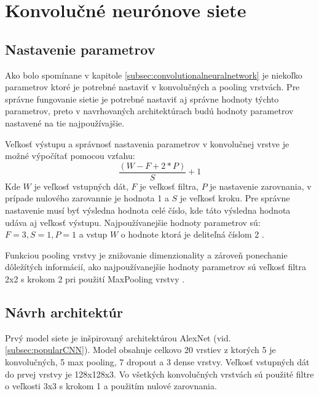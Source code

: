 
\section{Konvolučné neurónove siete}
\label{sec:architekuraCNN}

\subsection{Nastavenie parametrov}
\label{subsec:nastavenieparametrov}
Ako bolo spomínane v kapitole \ref{subsec:convolutionalneuralnetwork} je niekoľko parametrov ktoré je potrebné
    nastaviť v konvolučných a pooling vrstvách.
Pre správne fungovanie sietie je potrebné nastaviť aj správne hodnoty týchto parametrov, preto v navrhovaných architektúrach budú
    hodnoty parametrov nastavené na tie najpoužívajšie.

Veľkosť výstupu a správnosť nastavenia parametrov v konvolučnej vrstve je možné výpočítať pomocou vzťahu:
\begin{equation}
    \frac{(W - F + 2*P)}{S} + 1
\end{equation}
Kde $W$ je veľkosť vstupných dát, $F$ je veľkosť filtra, $P$ je nastavenie zarovnania, v prípade nulového zarovannie je hodnota 1 a $S$ je veľkosť kroku.
Pre správne nastavenie musí byť výsledna hodnota celé číslo, kde táto výsledna hodnota udáva aj veľkosť výstupu.
Najpoužívanejšie hodnoty parametrov sú: $F = 3, S = 1, P = 1$ a vstup $W$ o hodnote ktorá je deliteľná číslom 2 \cite{odkaz:CNNArchitecture}.

Funkciou pooling vrstvy je znižovanie dimenzionality a zároveň ponechanie dôležítých informácií, ako najpoužívanejšie hodnoty parametrov sú
    veľkosť filtra 2x2 s krokom 2 pri použití MaxPooling vrstvy \cite{odkaz:CNNArchitecture}.


\subsection{Návrh architektúr}
\label{subsec:navrharchitektur}
Prvý model siete je inšpirovaný architektúrou AlexNet (vid. \ref{subsec:popularCNN}).
Model obsahuje celkovo 20 vrstiev z ktorých 5 je konvolučných, 5 max pooling, 7 dropout a 3 dense vrstvy.
Veľkosť vstupných dát do prvej vrstvy je 128x128x3.
Vo všetkých konvolučných vrstvách sú použité filtre o veľkosti 3x3 s krokom 1 a použitím nulové zarovnania.

